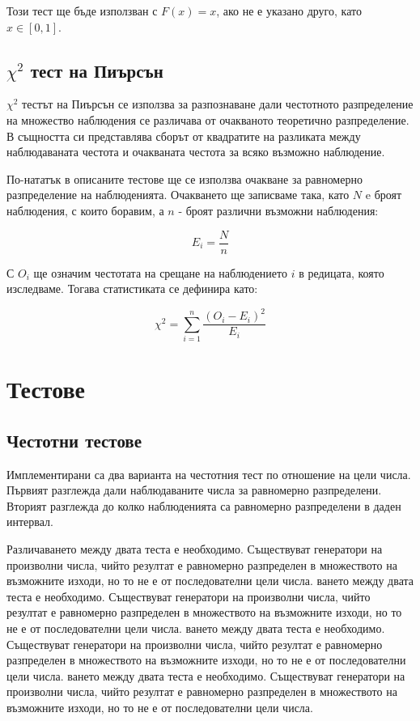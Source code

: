 \documentclass[12pt,a4paper]{article}
\theoremstyle{plain}
\begin{document}
        Този тест ще бъде използван с $F(x) = x$, ако не е указано друго, като $x \in [0, 1]$.

    \subsection{$\chi^2$ тест на Пиърсън}

        $\chi^2$ тестът на Пиърсън се използва за разпознаване дали честотното разпределение на множество наблюдения се различава от очакваното теоретично разпределение. В същността си представлява сборът от квадратите на разликата между наблюдаваната честота и очакваната честота за всяко възможно наблюдение. \cite{Pearson1900}
        
        По-нататък в описаните тестове ще се използва очакване за равномерно разпределение на наблюденията. Очакването ще записваме така, като $N$ e броят наблюдения, с които боравим, а $n$ - броят различни възможни наблюдения:

        \[
            E_i = \frac{N}{n}
        \]
        
        С $O_i$ ще означим честотата на срещане на наблюдението $i$ в редицата, която изследваме. Тогава статистиката се дефинира като:

        \[
            \chi^2 = \sum_{i=1}^{n}\frac{(O_i - E_i)^2}{E_i}
        \]

\section{Тестове}

    \subsection{Честотни тестове}

        Имплементирани са два варианта на честотния тест по отношение на цели числа. Първият разглежда дали наблюдаваните числа за равномерно разпределени. Вторият разглежда до колко наблюденията са равномерно разпределени в даден интервал.

        Различаването между двата теста е необходимо. Съществуват генератори на произволни числа, чийто резултат е равномерно разпределен в множеството на възможните изходи, но то не е от последователни цели числа. ването между двата теста е необходимо. Съществуват генератори на произволни числа, чийто резултат е равномерно разпределен в множеството на възможните изходи, но то не е от последователни цели числа. ването между двата теста е необходимо. Съществуват генератори на произволни числа, чийто резултат е равномерно разпределен в множеството на възможните изходи, но то не е от последователни цели числа. ването между двата теста е необходимо. Съществуват генератори на произволни числа, чийто резултат е равномерно разпределен в множеството на възможните изходи, но то не е от последователни цели числа.
\end{document}
